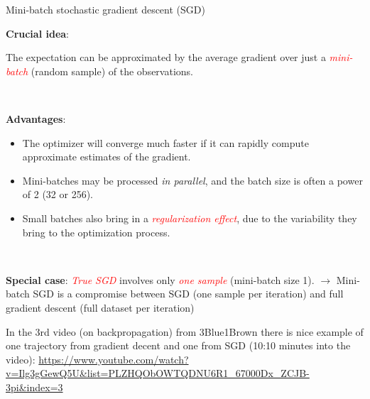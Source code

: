 \documentclass[
  10pt,
  ignorenonframetext,
]{beamer}
\providecommand{\tightlist}{%
  \setlength{\itemsep}{0pt}\setlength{\parskip}{0pt}}
\begin{document}
\begin{frame}
\begin{block}{Mini-batch stochastic gradient descent (SGD)}
\protect\hypertarget{mini-batch-stochastic-gradient-descent-sgd}{}
\(~\)

\textbf{Crucial idea}:

The expectation can be approximated by the average gradient over just a
\emph{\textcolor{red}{mini-batch}} (random sample) of the observations.

\(~\)

\textbf{Advantages}:

\vspace{1mm}

\begin{itemize}
\tightlist
\item
  The optimizer will converge much faster if it can rapidly compute
  approximate estimates of the gradient.
\end{itemize}

\vspace{1mm}

\begin{itemize}
\tightlist
\item
  Mini-batches may be processed \emph{in parallel}, and the batch size
  is often a power of 2 (32 or 256).
\end{itemize}

\vspace{1mm}

\begin{itemize}
\tightlist
\item
  Small batches also bring in a
  \emph{\textcolor{red}{regularization effect}}, due to the variability
  they bring to the optimization process.
\end{itemize}

\(~\)

\textbf{Special case}: \emph{\textcolor{red}{True SGD}} involves only
\emph{\textcolor{red}{one sample}} (mini-batch size 1). \(\rightarrow\)
Mini-batch SGD is a compromise between SGD (one sample per iteration)
and full gradient descent (full dataset per iteration)
\end{block}
\end{frame}

\begin{frame}
In the 3rd video (on backpropagation) from 3Blue1Brown there is nice
example of one trajectory from gradient decent and one from SGD (10:10
minutes into the video):
\url{https://www.youtube.com/watch?v=Ilg3gGewQ5U\&list=PLZHQObOWTQDNU6R1_67000Dx_ZCJB-3pi\&index=3}
\end{frame}
\end{document}
